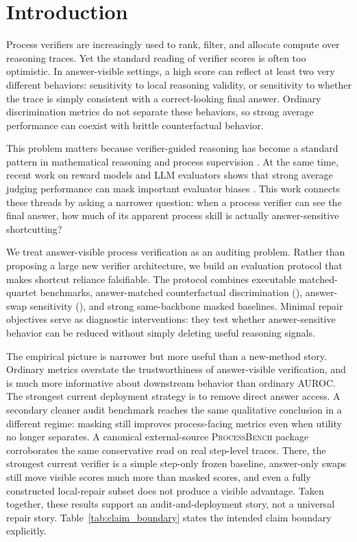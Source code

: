 \section{Introduction}

Process verifiers are increasingly used to rank, filter, and allocate compute
over reasoning traces. Yet the standard reading of verifier scores is often too
optimistic. In answer-visible settings, a high score can reflect at least two
very different behaviors: sensitivity to local reasoning validity, or
sensitivity to whether the trace is simply consistent with a correct-looking
final answer. Ordinary discrimination metrics do not separate these behaviors,
so strong average performance can coexist with brittle counterfactual behavior.

This problem matters because verifier-guided reasoning has become a standard
pattern in mathematical reasoning and process supervision
\citep{cobbe2021training,lightman2023verify,wang2024mips}. At the same time,
recent work on reward models and LLM evaluators shows that strong average
judging performance can mask important evaluator biases
\citep{lambert2024rewardbench,panickssery2024selfprefer,wang2024selftaught}.
This work connects these threads by asking a narrower question: when a process
verifier can see the final answer, how much of its apparent process skill is
actually answer-sensitive shortcutting?

We treat answer-visible process verification as an auditing problem. Rather
than proposing a large new verifier architecture, we build an evaluation
protocol that makes shortcut reliance falsifiable. The protocol combines
executable matched-quartet benchmarks, answer-matched counterfactual
discrimination (\amcd), answer-swap sensitivity (\ass), and strong
same-backbone masked baselines. Minimal repair objectives serve as diagnostic
interventions: they test whether answer-sensitive behavior can be reduced
without simply deleting useful reasoning signals.

The empirical picture is narrower but more useful than a new-method story.
Ordinary metrics overstate the trustworthiness of answer-visible verification,
and \amcd{} is much more informative about downstream behavior than ordinary
AUROC. The strongest current deployment strategy is to remove direct answer
access. A secondary cleaner audit benchmark reaches the same qualitative
conclusion in a different regime: masking still improves process-facing
metrics even when utility no longer separates. A canonical external-source
\textsc{ProcessBench} package corroborates the same conservative read on real
step-level traces. There, the strongest current verifier is a simple step-only
frozen baseline, answer-only swaps still move visible scores much more than
masked scores, and even a fully constructed local-repair subset does not
produce a visible advantage. Taken together, these results support an
audit-and-deployment story, not a universal repair story.
Table~\ref{tab:claim_boundary} states the intended claim boundary explicitly.

